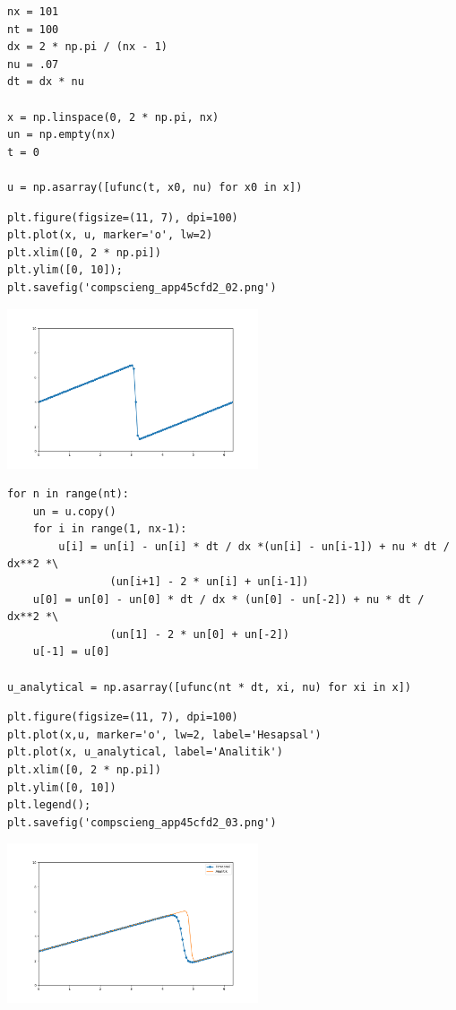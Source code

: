 \documentclass[12pt,fleqn]{article}\usepackage{../../common}
\begin{document}
\begin{verbatim}
nx = 101
nt = 100
dx = 2 * np.pi / (nx - 1)
nu = .07
dt = dx * nu

x = np.linspace(0, 2 * np.pi, nx)
un = np.empty(nx)
t = 0

u = np.asarray([ufunc(t, x0, nu) for x0 in x])
\end{verbatim}

\begin{verbatim}
plt.figure(figsize=(11, 7), dpi=100)
plt.plot(x, u, marker='o', lw=2)
plt.xlim([0, 2 * np.pi])
plt.ylim([0, 10]);
plt.savefig('compscieng_app45cfd2_02.png')
\end{verbatim}


\includegraphics[width=20em]{compscieng_app45cfd2_02.png}

\begin{verbatim}
for n in range(nt):
    un = u.copy()
    for i in range(1, nx-1):
        u[i] = un[i] - un[i] * dt / dx *(un[i] - un[i-1]) + nu * dt / dx**2 *\
                (un[i+1] - 2 * un[i] + un[i-1])
    u[0] = un[0] - un[0] * dt / dx * (un[0] - un[-2]) + nu * dt / dx**2 *\
                (un[1] - 2 * un[0] + un[-2])
    u[-1] = u[0]
        
u_analytical = np.asarray([ufunc(nt * dt, xi, nu) for xi in x])
\end{verbatim}

\begin{verbatim}
plt.figure(figsize=(11, 7), dpi=100)
plt.plot(x,u, marker='o', lw=2, label='Hesapsal')
plt.plot(x, u_analytical, label='Analitik')
plt.xlim([0, 2 * np.pi])
plt.ylim([0, 10])
plt.legend();
plt.savefig('compscieng_app45cfd2_03.png')
\end{verbatim}


\includegraphics[width=20em]{compscieng_app45cfd2_03.png}
\end{document}
